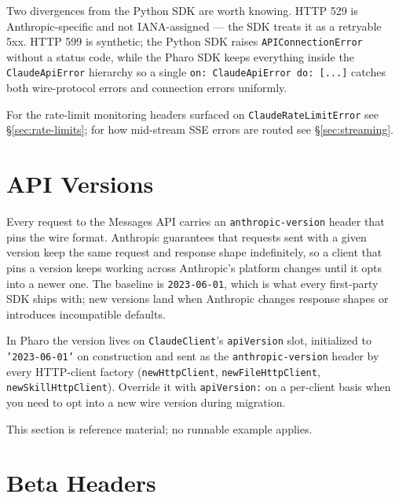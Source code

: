 \documentclass[a4paper,10pt,fleqn]{article}
\begin{document}
Two divergences from the Python SDK are worth knowing.  HTTP 529
is Anthropic-specific and not IANA-assigned --- the SDK treats it
as a retryable 5xx.  HTTP 599 is synthetic; the Python SDK raises
\texttt{APIConnectionError} without a status code, while the Pharo
SDK keeps everything inside the \texttt{ClaudeApiError} hierarchy
so a single \texttt{on: ClaudeApiError do: [...]} catches both
wire-protocol errors and connection errors uniformly.

For the rate-limit monitoring headers surfaced on
\texttt{ClaudeRateLimitError} see \S\ref{sec:rate-limits}; for
how mid-stream SSE errors are routed see \S\ref{sec:streaming}.

\medskip
{}

\section{API Versions}
\label{sec:api-versions}

Every request to the Messages API carries an \texttt{anthropic-version}
header that pins the wire format.  Anthropic guarantees that requests
sent with a given version keep the same request and response shape
indefinitely, so a client that pins a version keeps working across
Anthropic's platform changes until it opts into a newer one.  The
baseline is \texttt{2023-06-01}, which is what every first-party SDK
ships with; new versions land when Anthropic changes response shapes
or introduces incompatible defaults.

In Pharo the version lives on \texttt{ClaudeClient}'s
\texttt{apiVersion} slot, initialized to \texttt{'2023-06-01'} on
construction and sent as the \texttt{anthropic-version} header by
every HTTP-client factory (\texttt{newHttpClient},
\texttt{newFileHttpClient}, \texttt{newSkillHttpClient}).  Override it
with \texttt{apiVersion:} on a per-client basis when you need to opt
into a new wire version during migration.

This section is reference material; no runnable example applies.

\medskip
{}

\section{Beta Headers}
\label{sec:beta-headers}
\end{document}

